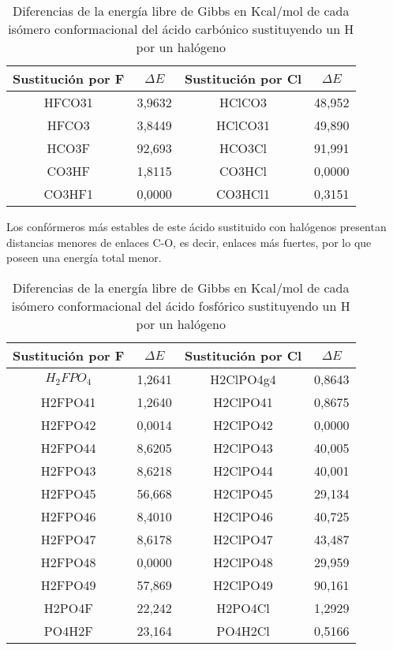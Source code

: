 \begin{table}[H]
\begin{center}
\begin{tabular}{|c|c|c|c|}
\hline
Sustitución por F & $\Delta E$ & Sustitución por Cl & $\Delta E$ \\ \hline
HFCO31 & 3,9632 & HClCO3 & 48,952 \\ \hline
HFCO3 & 3,8449 & HClCO31 & 49,890 \\ \hline
HCO3F & 92,693 & HCO3Cl & 91,991 \\ \hline
CO3HF & 1,8115 & CO3HCl & 0,0000 \\ \hline
CO3HF1 & 0,0000 & CO3HCl1 & 0,3151 \\ \hline
\end{tabular}
\caption{Diferencias de la energía libre de Gibbs en Kcal/mol de cada isómero conformacional del ácido carbónico sustituyendo un H por un halógeno}
\end{center}
\end{table}

Los confórmeros más estables de este ácido sustituido con halógenos presentan distancias menores de enlaces C-O, es decir, enlaces más fuertes, por lo que poseen una energía total menor.
\begin{table}[H]
\begin{center}
\begin{tabular}{|c|c|c|c|}
\hline
Sustitución por F & $\Delta E$ & Sustitución por Cl & $\Delta E$ \\ \hline
$H_2FPO_4$& 1,2641 & H2ClPO4g4 & 0,8643 \\ \hline
H2FPO41 & 1,2640 & H2ClPO41 & 0,8675 \\ \hline
H2FPO42 & 0,0014 & H2ClPO42 & 0,0000 \\ \hline
H2FPO44	& 8,6205 & H2ClPO43 & 40,005 \\ \hline
H2FPO43	& 8,6218 & H2ClPO44 & 40,001 \\ \hline
H2FPO45	& 56,668 & H2ClPO45 & 29,134 \\ \hline
H2FPO46	& 8,4010 & H2ClPO46 & 40,725 \\ \hline
H2FPO47	& 8,6178 & H2ClPO47 & 43,487 \\ \hline
H2FPO48	& 0,0000 & H2ClPO48 & 29,959 \\ \hline
H2FPO49	& 57,869 & H2ClPO49 & 90,161 \\ \hline
H2PO4F & 22,242 & H2PO4Cl & 1,2929 \\ \hline
PO4H2F & 23,164 & PO4H2Cl & 0,5166 \\ \hline
\end{tabular}
\caption{Diferencias de la energía libre de Gibbs en Kcal/mol de cada isómero conformacional del ácido fosfórico sustituyendo un H por un halógeno}
\end{center}
\end{table}
